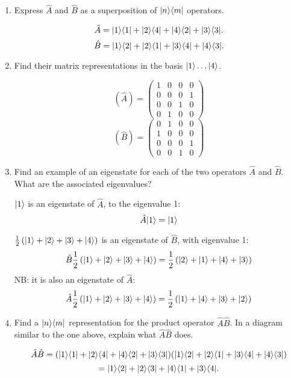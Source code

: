 \documentclass{chem6155problemset}
\begin{document}
\begin{enumerate}[resume]
	\begin{enumerate}
		\item Express $\hat A$ and $\hat B$ as a superposition of $|{n}\rangle \langle{m}|$ operators.
		\begin{solution}
			\[ 
				\hat A = |{1}\rangle\langle{1}|+|{2}\rangle\langle{4}|+|{4}\rangle\langle{2}|+|{3}\rangle\langle{3}|. 
			\]
			\[
				\hat B = |{1}\rangle\langle{2}|+|{2}\rangle\langle{1}| + |{3}\rangle\langle{4}|+|{4}\rangle\langle{3}|.
			\]

		\end{solution}
		\item Find their matrix representations in the basis $|{1}\rangle \dots |{4}\rangle$.
		\begin{solution}
		\[	
			(\hat A) = \begin{pmatrix}
				1 & 0 & 0 & 0 \\
				0 & 0 & 0 & 1 \\
				0 & 0 & 1 & 0 \\
				0 & 1 & 0 & 0 
			\end{pmatrix}
		\]
		\[
			(\hat B) = \begin{pmatrix}
			0 & 1 & 0 & 0  \\
			1 & 0 & 0 & 0  \\
			0 & 0 & 0 & 1 \\
			0 & 0 & 1 & 0 
			\end{pmatrix}
		\]
		\end{solution}

		\item Find an example of an eigenstate for each of the two operators $\hat A$ and $\hat B$. What are the associated eigenvalues?
		\begin{solution}
		$|{1}\rangle$ is an eigenstate of $\hat A$, to the eigenvalue 1:
			\[ \hat A |{1}\rangle = |{1}\rangle\]

		$\frac{1}{2}\left(|{1}\rangle + |{2}\rangle + |{3}\rangle + |{4}\rangle\right)$ is an eigenstate of $\hat B$, with eigenvalue 1:
		\[
		 \hat B \frac{1}{2}\left(|{1}\rangle + |{2}\rangle + |{3}\rangle + |{4}\rangle\right) = \frac{1}{2}\left(|{2}\rangle + |{1}\rangle + |{4}\rangle + |{3}\rangle\right)
		\]
		NB: it is also an eigenstate of $\hat A$:
		\[
		 \hat A \frac{1}{2}\left(|{1}\rangle + |{2}\rangle + |{3}\rangle + |{4}\rangle\right) = \frac{1}{2}\left(|{1}\rangle + |{4}\rangle + |{3}\rangle + |{2}\rangle\right)
		\]
		\end{solution}

		\item Find a $|{n}\rangle\langle{m}|$ representation for the product operator $\hat A\hat B$. In a diagram similar to the one above, explain what $\hat A\hat B$ does.
		\begin{solution} [PS]
			\[ 
				\hat A\hat B = (|{1}\rangle\langle{1}|+|{2}\rangle\langle{4}|+|{4}\rangle\langle{2}|+|{3}\rangle\langle{3}|)(|{1}\rangle\langle{2}|+|{2}\rangle\langle{1}| + |{3}\rangle\langle{4}|+|{4}\rangle\langle{3}|)
			\]
			\[
				= |{1}\rangle\langle{2}|+|{2}\rangle\langle{3}|+|{4}\rangle\langle{1}|+|{3}\rangle\langle{4}|.
			\]


\end{solution}
\end{enumerate}
\end{enumerate}
\end{document}
